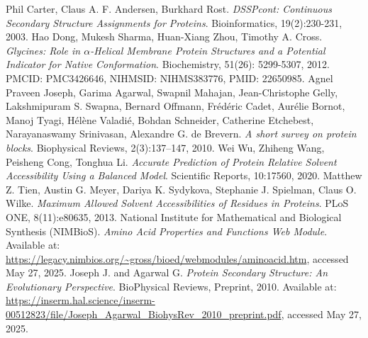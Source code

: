 \documentclass[a4paper,12pt]{article}
\begin{document}
\newpage
\begin{thebibliography}{5}
    Phil Carter, Claus A. F. Andersen, Burkhard Rost. 
    \textit{DSSPcont: Continuous Secondary Structure Assignments for Proteins}. 
    Bioinformatics, 19(2):230-231, 2003.
    Hao Dong, Mukesh Sharma, Huan-Xiang Zhou, Timothy A. Cross.  
    \textit{Glycines: Role in $\alpha$-Helical Membrane Protein Structures and a Potential Indicator for Native Conformation}.  
    Biochemistry, 51(26): 5299-5307, 2012.  
    PMCID: PMC3426646, NIHMSID: NIHMS383776, PMID: 22650985.
    Agnel Praveen Joseph, Garima Agarwal, Swapnil Mahajan, 
    Jean-Christophe Gelly, Lakshmipuram S. Swapna, Bernard Offmann, 
    Frédéric Cadet, Aurélie Bornot, Manoj Tyagi, Hélène Valadié, Bohdan Schneider, 
    Catherine Etchebest, Narayanaswamy Srinivasan, Alexandre G. de Brevern.  
    \textit{A short survey on protein blocks}.  
    Biophysical Reviews, 2(3):137–147, 2010.
	Wei Wu, Zhiheng Wang, Peisheng Cong, Tonghua Li.  
	\textit{Accurate Prediction of Protein Relative Solvent Accessibility Using a Balanced Model}.  
	Scientific Reports, 10:17560, 2020.
	Matthew Z. Tien, Austin G. Meyer, Dariya K. Sydykova, Stephanie J. Spielman, Claus O. Wilke.  
	\textit{Maximum Allowed Solvent Accessibilities of Residues in Proteins}.  
	PLoS ONE, 8(11):e80635, 2013.
    National Institute for Mathematical and Biological Synthesis (NIMBioS). 
    \textit{Amino Acid Properties and Functions Web Module}. 
    Available at: \url{https://legacy.nimbios.org/~gross/bioed/webmodules/aminoacid.htm}, accessed May 27, 2025.
    Joseph J. and Agarwal G. 
    \textit{Protein Secondary Structure: An Evolutionary Perspective}. 
    BioPhysical Reviews, Preprint, 2010. 
    Available at: \url{https://inserm.hal.science/inserm-00512823/file/Joseph_Agarwal_BiohysRev_2010_preprint.pdf}, accessed May 27, 2025.

\end{thebibliography}
\end{document}
